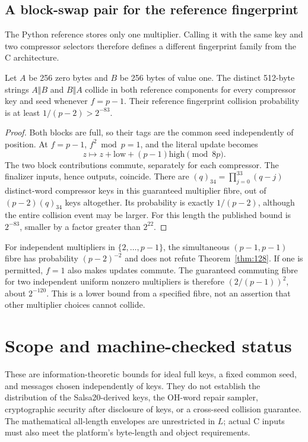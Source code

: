 \subsection{A block-swap pair for the reference fingerprint}
The Python reference stores only one multiplier. Calling it with the same key and two compressor selectors therefore defines a different fingerprint family from the C architecture.
\begin{proposition}\label{prop:swap}
Let $A$ be 256 zero bytes and $B$ be 256 bytes of value one. The distinct 512-byte strings $A\Vert B$ and $B\Vert A$ collide in both reference components for every compressor key and seed whenever $f=p-1$. Their reference fingerprint collision probability is at least $1/(p-2)>2^{-83}$.
\end{proposition}
\begin{proof}
Both blocks are full, so their tags are the common seed independently of position. At $f=p-1$, $f^2\bmod p=1$, and the literal update becomes
\[
 z\longmapsto z+\mathrm{low}+(p-1)\mathrm{high}\pmod{8p}.
\]
The two block contributions commute, separately for each compressor. The finalizer inputs, hence outputs, coincide. There are $(q)_{34}=\prod_{j=0}^{33}(q-j)$ distinct-word compressor keys in this guaranteed multiplier fibre, out of $(p-2)(q)_{34}$ keys altogether. Its probability is exactly $1/(p-2)$, although the entire collision event may be larger. For this length the published bound is $2^{-83}$, smaller by a factor greater than $2^{22}$.
\end{proof}
For independent multipliers in $\{2,\ldots,p-1\}$, the simultaneous $(p-1,p-1)$ fibre has probability $(p-2)^{-2}$ and does not refute Theorem~\ref{thm:128}. If one is permitted, $f=1$ also makes updates commute. The guaranteed commuting fibre for two independent uniform nonzero multipliers is therefore $(2/(p-1))^2$, about $2^{-120}$. This is a lower bound from a specified fibre, not an assertion that other multiplier choices cannot collide.

\section{Scope and machine-checked status}\label{sec:lean}
These are information-theoretic bounds for ideal full keys, a fixed common seed, and messages chosen independently of keys. They do not establish the distribution of the Salsa20-derived keys, the OH-word repair sampler, cryptographic security after disclosure of keys, or a cross-seed collision guarantee. The mathematical all-length envelopes are unrestricted in $L$; actual C inputs must also meet the platform's byte-length and object requirements.

